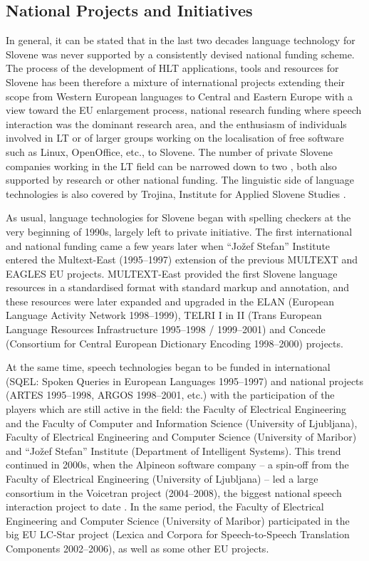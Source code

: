 \begin{multicols}{2}
\subsection{National Projects and Initiatives}

In general, it can be stated that in the last two decades language technology for Slovene was never supported by a consistently devised national funding scheme. The process of the development of HLT applications, tools and resources for Slovene has been therefore a mixture of international projects extending their scope from Western European languages to Central and Eastern Europe with a view toward the EU enlargement process, national research funding where speech interaction was the dominant research area, and the enthusiasm of individuals involved in LT or of larger groups working on the localisation of free software such as Linux, OpenOffice, etc., to Slovene.  The number of private Slovene companies working in the LT field can be narrowed down to two \cite{Alp3,Amb6}, both also supported by research or other national funding. The linguistic side of language technologies is also covered by Trojina, Institute for Applied Slovene Studies \cite{Troj1}.

As usual, language technologies for Slovene began with spelling checkers at the very beginning of 1990s, largely left to private initiative. The first international and national funding came a few years later when “Jožef Stefan” Institute entered the Multext-East (1995--1997) extension of the previous MULTEXT and EAGLES EU projects. MULTEXT-East provided the first Slovene language resources in a standardised format with standard markup and annotation, and these resources were later expanded and upgraded in the ELAN (European Language Activity Network 1998--1999), TELRI I in II (Trans European Language Resources Infrastructure 1995--1998 / 1999--2001) and Concede (Consortium for Central European Dictionary Encoding 1998--2000) projects.


At the same time, speech technologies began to be funded in international (SQEL: Spoken Queries in European Languages 1995--1997) and national projects (ARTES 1995--1998, ARGOS 1998--2001, etc.) with the participation of the players which are still active in the field: the Faculty of Electrical Engineering  and the Faculty of Computer and Information Science (University of Ljub\-ljana), Faculty of Electrical Engineering and Computer Science (University of Maribor) and  “Jožef Stefan” Institute (Department of Intelligent Systems). This trend continued in 2000s, when the Alpineon software company – a spin-off from the Faculty of Electrical Engineering (University of Ljub\-ljana) – led a large consortium in the Voicetran project (2004--2008), the biggest national speech interaction project to date \cite{Alp2}. In the same period, the Faculty of Electrical Engineering and Computer Science (University of Maribor) participated in the big EU LC-Star project (Lexica and Corpora for Speech-to-Speech Translation Components 2002--2006), as well as some other EU projects. 


\end{multicols}
